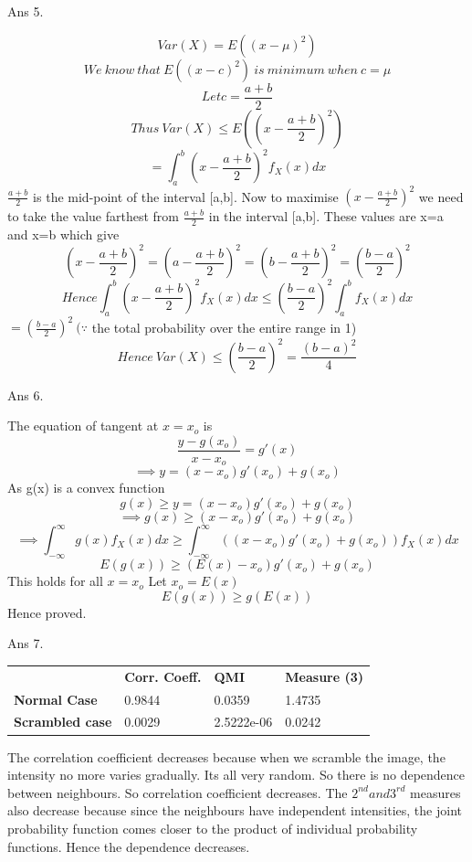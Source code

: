 \documentclass[11pt]{article}
\begin{document}
\pagebreak
Ans 5.\begin{center}
$$Var(X) = E((x-\mu)^2)$$
$$We\ know\ that\ E((x-c)^2)\ is\ minimum\ when\ c = \mu$$
$$Let c = \frac{a+b}{2}$$
$$Thus\ Var(X) \le E((x-\frac{a+b}{2})^2)$$
$$=\int_{a}^{b}(x - \frac{a+b}{2})^2 f_X(x) dx$$
$\frac{a+b}{2}$ is the mid-point of the interval [a,b].
Now to maximise $(x - \frac{a+b}{2})^2$ we need to take the value farthest from $\frac{a+b}{2}$ in the interval [a,b]. These values are x=a and x=b which give
$$(x - \frac{a+b}{2})^2 = (a - \frac{a+b}{2})^2 = (b - \frac{a+b}{2})^2 = (\frac{b-a}{2})^2$$
$$Hence \int_{a}^{b}(x - \frac{a+b}{2})^2 f_X(x) dx \le (\frac{b-a}{2})^2 \int_{a}^{b} f_X(x) dx$$
$=(\frac{b-a}{2})^2\ (\because$ the total probability over the entire range in 1)
$$Hence\ Var(X) \le (\frac{b-a}{2})^2=\frac{(b-a)^2}{4}$$
\newline
\newline
\end{center}

Ans 6.\begin{center}
The equation of tangent at $x=x_o$ is
$$\frac{y-g(x_o)}{x-x_o} = g'(x)$$
$$\implies y=(x-x_o)g'(x_o)+g(x_o)$$
As g(x) is a convex function
$$g(x) \ge y=(x-x_o)g'(x_o)+g(x_o)$$
$$\implies g(x) \ge (x-x_o)g'(x_o) + g(x_o)$$
$$\implies \int_{-\infty}^{\infty}g(x)f_X(x)dx \ge \int_{-\infty}^{\infty}((x-x_o)g'(x_o) + g(x_o))f_X(x)dx$$
$$E(g(x)) \ge (E(x) - x_o)g'(x_o) + g(x_o)$$
This holds for all $x=x_o$
Let $x_o=E(x)$
$$E(g(x)) \ge g(E(x))$$
Hence proved.
\newline
\newline
\end{center}
\pagebreak

Ans 7.\begin{center}
\begin{table}[h]
\centering
\begin{tabular}{llll}
                        & \textbf{Corr. Coeff.} & \textbf{QMI} & \textbf{Measure (3)} \\
\textbf{Normal Case}    & 0.9844                      & 0.0359       & 1.4735               \\
\textbf{Scrambled case} & 0.0029                      & 2.5222e-06   & 0.0242              
\end{tabular}
\end{table}
\end{center}

The correlation coefficient decreases because when we scramble the image, the intensity no more varies gradually. Its all very random. So there is no dependence between neighbours. So correlation coefficient decreases. The $2^{nd} and 3^{rd}$ measures also decrease because since the neighbours have independent intensities, the joint probability function comes closer to the product of individual probability functions. Hence the dependence decreases.
\end{document}
